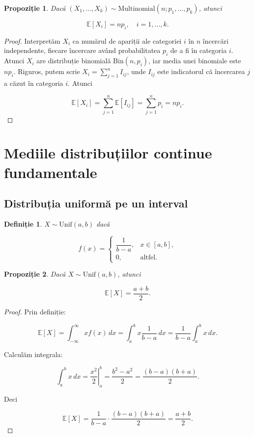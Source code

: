 \documentclass[12pt]{article}
\theoremstyle{plain}
\newtheorem{definition}{Definiție}
\newtheorem{proposition}{Propoziție}
\begin{document}
\begin{proposition}
Dacă $(X_1,\dots,X_k) \sim \mathrm{Multinomial}(n; p_1,\dots,p_k)$, atunci


\[
\mathbb{E}[X_i] = n p_i,\quad i=1,\dots,k.
\]


\end{proposition}

\begin{proof}
Interpretăm $X_i$ ca numărul de apariții ale categoriei $i$ în $n$ încercări independente,
fiecare încercare având probabilitatea $p_i$ de a fi în categoria $i$.
Atunci $X_i$ are distribuție binomială $\mathrm{Bin}(n,p_i)$, iar media unei binomiale este $np_i$.
Riguros, putem scrie $X_i = \sum_{j=1}^n I_{ij}$, unde $I_{ij}$ este indicatorul că
încercarea $j$ a căzut în categoria $i$. Atunci


\[
\mathbb{E}[X_i] = \sum_{j=1}^n \mathbb{E}[I_{ij}] = \sum_{j=1}^n p_i = n p_i.
\]


\end{proof}

\section{Mediile distribuțiilor continue fundamentale}

\subsection{Distribuția uniformă pe un interval}

\begin{definition}
$X \sim \mathrm{Unif}(a,b)$ dacă


\[
f(x) =
\begin{cases}
\dfrac{1}{b-a}, & x \in [a,b], \\[6px]
0, & \text{altfel}.
\end{cases}
\]



\end{definition}

\begin{proposition}
Dacă $X \sim \mathrm{Unif}(a,b)$, atunci


\[
\mathbb{E}[X] = \frac{a+b}{2}.
\]


\end{proposition}

\begin{proof}
Prin definiție:


\[
\mathbb{E}[X] = \int_{-\infty}^{\infty} x f(x)\, dx
= \int_a^b x \frac{1}{b-a}\, dx
= \frac{1}{b-a} \int_a^b x\, dx.
\]


Calculăm integrala:


\[
\int_a^b x\, dx = \left.\frac{x^2}{2}\right|_a^b = \frac{b^2-a^2}{2}
= \frac{(b-a)(b+a)}{2}.
\]


Deci


\[
\mathbb{E}[X] = \frac{1}{b-a} \cdot \frac{(b-a)(b+a)}{2} = \frac{a+b}{2}.
\]


\end{proof}
\end{document}
